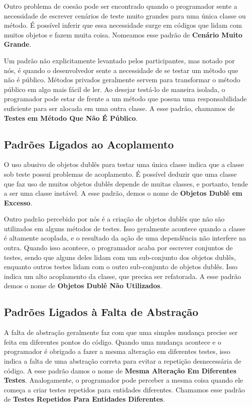 \documentclass[conference]{IEEEtran}
\begin{document}
Outro problema de coesão pode ser encontrado quando o programador
sente a necessidade de escrever cenários de teste muito grandes para uma
única classe ou método. É possível inferir que essa necessidade surge 
em códigos que lidam com muitos objetos e fazem muita coisa. Nomeamos
esse padrão de \textbf{Cenário Muito Grande}.

Um padrão não explicitamente levantado pelos participantes, mas notado
por nós, é quando o desenvolvedor sente a necessidade de se testar
um método que não é público. Métodos privados geralmente servem para 
transformar o método público em algo mais fácil de ler. Ao desejar
testá-lo de maneira isolada, o programador pode estar de frente a
um método que possua uma responsabilidade suficiente para ser
alocada em uma outra classe. A esse padrão, chamamos de 
\textbf{Testes em Método Que Não É Público}.

\subsection{Padrões Ligados ao Acoplamento}

O uso abusivo de objetos dublês para testar uma
única classe indica que a classe sob teste possui problemas
de acoplamento. É possível deduzir que uma classe que faz uso de muitos
objetos dublês depende de muitas classes, e portanto, tende a ser
uma classe instável. A esse padrão, demos o nome de \textbf{Objetos Dublê em Excesso}.

Outro padrão percebido por nós é a criação de objetos dublês que não
são utilizados em alguns métodos de testes. Isso geralmente acontece quando
a classe é altamente acoplada, e o resultado da ação de uma dependência não
interfere na outra. Quando isso acontece, o programador acaba por escrever
conjuntos de testes, sendo que alguns deles lidam com um sub-conjunto dos objetos dublês,
enquanto outros testes lidam com o outro sub-conjunto de objetos dublês. 
Isso indica um alto acoplamento 
da classe, que precisa ser refatorada. A esse padrão demos o nome de
\textbf{Objetos Dublê Não Utilizados}.


\subsection{Padrões Ligados à Falta de Abstração}

A falta de abstração geralmente faz com que uma simples mudança precise
ser feita em diferentes pontos do código. Quando uma mudança acontece e 
o programador é obrigado a fazer a mesma alteração em diferentes testes,
isso indica a falta de uma abstração correta para evitar a 
repetição desnecessária de código.
A esse padrão damos o nome de \textbf{Mesma Alteração Em Diferentes Testes}.
Analogamente, o programador pode perceber a mesma coisa
quando ele começa a criar testes repetidos para entidades diferentes.
Chamamos esse padrão de \textbf{Testes Repetidos Para Entidades Diferentes}.
\end{document}
